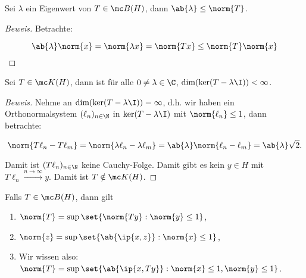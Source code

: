 \begin{theorem}
	
	Sei $\lambda$ ein Eigenwert von $T \in \mc B(H)$, dann $\ab{\lambda} \leq \norm{T}$.
	\label{norm_eigenwert}
	\begin{proof}[Beweis]
		
		Betrachte:
		
		\[ \ab{\lambda} \norm{x} = \norm{\lambda x} = \norm{Tx} \leq \norm{T} \norm{x} \]
		
	\end{proof}
	
\end{theorem}


\begin{theorem}
	
	Sei $T \in \mc K(H)$, dann ist für alle $0 \not= \lambda \in \C$, $\text{dim}(\ker(T - \lambda \I)) < \infty$.
	
	\begin{proof}[Beweis]
		
		Nehme an $\text{dim}(\ker(T - \lambda \I)) = \infty$, d.h. wir haben ein Orthonormalsystem $(\ell_n)_{n \in \N}$ in $\ker(T - \lambda\I)$ mit $\norm{\ell_n} \leq 1$, dann betrachte:
		
		\[ \norm{T\ell_n - T\ell_m} = \norm{\lambda\ell_n - \lambda \ell_m} = \ab{\lambda} \norm{\ell_n - \ell_m} = \ab{\lambda}\sqrt{2}. \]
		
		Damit ist $(T \ell_n)_{n \in \N}$ keine Cauchy-Folge. Damit gibt es kein $y \in H$ mit $T \ell_n \xrightarrow{n \to \infty} y$. Damit ist $T \notin \mc K(H)$.
		
	\end{proof}
	
\end{theorem}


\begin{rem}
	
	Falls $T \in \mc B(H)$, dann gilt
	
	\begin{enumerate}
		
		\item $\norm{T} = \sup{\set{\norm{Ty}:\norm{y} \leq 1}}$,
		
		\item $\norm{z} = \sup{\set{\ab{\ip{x, z}}: \norm{x} \leq 1}}$,
		
		\item Wir wissen also: $\norm{T} = \sup{\set{\ab{\ip{x, Ty}}: \norm{x} \leq 1, \norm{y} \leq 1}}$.
		
	\end{enumerate}
	
\end{rem}


